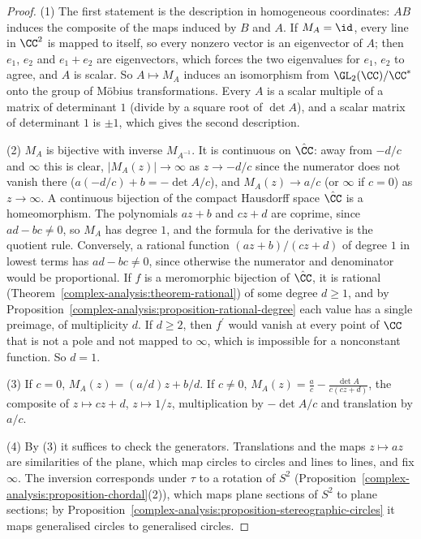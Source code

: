 \begin{proof}
(1) The first statement is the description in homogeneous coordinates: $AB$ induces the composite of the maps induced by $B$ and $A$. If $M_A = \id$, every line in $\CC^2$ is mapped to itself, so every
nonzero vector is an eigenvector of $A$; then $e_1$, $e_2$ and $e_1 + e_2$ are eigenvectors, which forces the two eigenvalues for $e_1$, $e_2$ to agree, and $A$ is scalar. So $A \mapsto M_A$ induces an isomorphism
from $\GL_2(\CC)/\CC^*$ onto the group of M\"obius transformations. Every $A$ is a scalar multiple of a matrix of determinant $1$ (divide by a square root of $\det A$), and a scalar matrix of determinant $1$ is
$\pm1$, which gives the second description.

(2) $M_A$ is bijective with inverse $M_{A^{-1}}$. It is continuous on $\hat{\CC}$: away from $-d/c$ and $\infty$ this is clear, $|M_A(z)| \to \infty$ as $z \to -d/c$ since the numerator does not vanish there
($a(-d/c) + b = -\det A/c$), and $M_A(z) \to a/c$ (or $\infty$ if $c = 0$) as $z \to \infty$. A continuous bijection of the compact Hausdorff space $\hat{\CC}$ is a homeomorphism. The polynomials $az + b$ and $cz + d$
are coprime, since $ad - bc \neq 0$, so $M_A$ has degree $1$, and the formula for the derivative is the quotient rule. Conversely, a rational function $(az + b)/(cz + d)$ of degree $1$ in lowest terms has
$ad - bc \neq 0$, since otherwise the numerator and denominator would be proportional. If $f$ is a meromorphic bijection of $\hat{\CC}$, it is rational (Theorem~\ref{complex-analysis:theorem-rational}) of some degree
$d \geq 1$, and by Proposition~\ref{complex-analysis:proposition-rational-degree} each value has a single preimage, of multiplicity $d$. If $d \geq 2$, then $f^{\prime}$ would vanish at every point of $\CC$ that is not a pole and
not mapped to $\infty$, which is impossible for a nonconstant function. So $d = 1$.

(3) If $c = 0$, $M_A(z) = (a/d)z + b/d$. If $c \neq 0$, $M_A(z) = \frac ac - \frac{\det A}{c(cz + d)}$, the composite of $z \mapsto cz + d$, $z \mapsto 1/z$, multiplication by $-\det A/c$ and translation by $a/c$.

(4) By (3) it suffices to check the generators. Translations and the maps $z \mapsto az$ are similarities of the plane, which map circles to circles and lines to lines, and fix $\infty$. The inversion corresponds under
$\tau$ to a rotation of $S^2$ (Proposition~\ref{complex-analysis:proposition-chordal}(2)), which maps plane sections of $S^2$ to plane sections; by Proposition~\ref{complex-analysis:proposition-stereographic-circles}
it maps generalised circles to generalised circles.
\end{proof}

